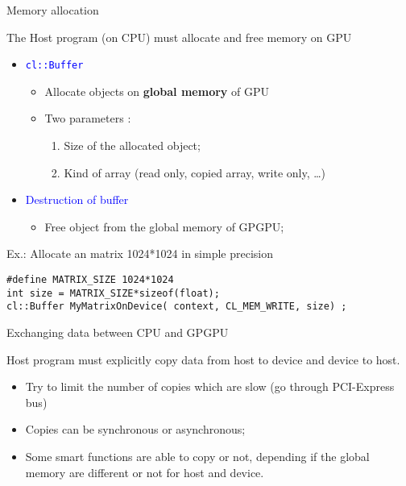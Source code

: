\documentclass{beamer}
\begin{document}
\begin{frame}[containsverbatim]{Memory allocation}

The Host program (on CPU) must allocate and free memory on GPU
\begin{itemize}
\item \textcolor{blue}{\texttt{cl::Buffer}}
  \begin{itemize}
  \item Allocate objects on \textbf{global memory} of GPU
  \item Two parameters :
    \begin{enumerate}
    \item Size of the allocated object;
    \item Kind of array (read only, copied array, write only, \ldots)
    \end{enumerate}
  \end{itemize}
\item \textcolor{blue}{Destruction of buffer}
  \begin{itemize}
  \item Free object from the global memory of GPGPU;
  \end{itemize}
\end{itemize}

\begin{exampleblock}{Ex.: Allocate an matrix 1024*1024 in simple precision}
    \begin{lstlisting}
#define MATRIX_SIZE 1024*1024
int size = MATRIX_SIZE*sizeof(float);
cl::Buffer MyMatrixOnDevice( context, CL_MEM_WRITE, size) ;
    \end{lstlisting}
\end{exampleblock}
\end{frame}

\begin{frame}{Exchanging data between CPU and GPGPU}

Host program must explicitly copy data from host to device and device to host.

\begin{itemize}
\item Try to limit the number of copies which are slow (go through PCI-Express bus)
\item Copies can be synchronous or asynchronous;
\item Some smart functions are able to copy or not, depending if the global memory
  are different or not for host and device.
\end{itemize}
\end{frame}
\end{document}
